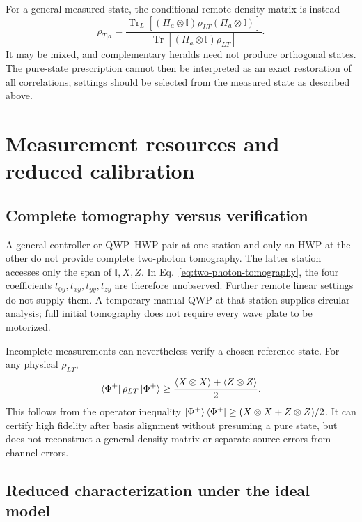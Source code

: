\documentclass[a4paper,10pt]{article}
\newcommand{\I}{\mathbb{I}}
\newcommand{\Tr}{\operatorname{Tr}}
\begin{document}
For a general measured state, the conditional remote density matrix is
instead
\begin{equation}
    \rho_{T|a}
    =\frac{
        \Tr_L[(\Pi_a\otimes\I)\rho_{LT}(\Pi_a\otimes\I)]
    }{
        \Tr[(\Pi_a\otimes\I)\rho_{LT}]
    }.
\end{equation}
It may be mixed, and complementary heralds need not produce orthogonal
states. The pure-state prescription cannot then be interpreted as an
exact restoration of all correlations; settings should be selected
from the measured state as described above.

\section{Measurement resources and reduced calibration}

\subsection{Complete tomography versus verification}

A general controller or QWP--HWP pair at one station and only an HWP at
the other do not provide complete two-photon tomography. The latter
station accesses only the span of $\I,X,Z$. In
Eq.~\eqref{eq:two-photon-tomography}, the four coefficients
$t_{0y},t_{xy},t_{yy},t_{zy}$ are therefore unobserved. Further remote
linear settings do not supply them. A temporary manual QWP at that
station supplies circular analysis; full initial tomography does not
require every wave plate to be motorized.

Incomplete measurements can nevertheless verify a chosen reference
state. For any physical $\rho_{LT}$,
\begin{equation}
    \bra{\Phi^+}\rho_{LT}\ket{\Phi^+}
    \geq\frac{\langle X\otimes X\rangle+
                  \langle Z\otimes Z\rangle}{2}.
    \label{eq:bell-fidelity-bound}
\end{equation}
This follows from the operator inequality
$\ket{\Phi^+}\bra{\Phi^+}\geq(X\otimes X+Z\otimes Z)/2$.
It can certify high fidelity after basis alignment without presuming a
pure state, but does not reconstruct a general density matrix or
separate source errors from channel errors.

\subsection{Reduced characterization under the ideal model}
\end{document}
